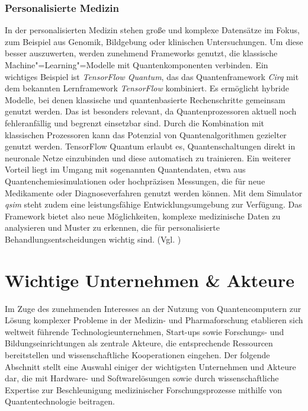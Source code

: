 \subsubsection*{Personalisierte Medizin}
In der personalisierten Medizin stehen große und komplexe Datensätze im Fokus, zum Beispiel aus Genomik, Bildgebung oder klinischen Untersuchungen. Um diese besser auszuwerten, werden zunehmend Frameworks genutzt, die klassische Machine"=Learning"=Modelle mit Quantenkomponenten verbinden. Ein wichtiges Beispiel ist \textit{TensorFlow Quantum}, das das Quantenframework \textit{Cirq} mit dem bekannten Lernframework \textit{TensorFlow} kombiniert. Es ermöglicht hybride Modelle, bei denen klassische und quantenbasierte Rechenschritte gemeinsam genutzt werden. Das ist besonders relevant, da Quantenprozessoren aktuell noch fehleranfällig und begrenzt einsetzbar sind. Durch die Kombination mit klassischen Prozessoren kann das Potenzial von Quantenalgorithmen gezielter genutzt werden. TensorFlow Quantum erlaubt es, Quantenschaltungen direkt in neuronale Netze einzubinden und diese automatisch zu trainieren. Ein weiterer Vorteil liegt im Umgang mit sogenannten Quantendaten, etwa aus Quantenchemiesimulationen oder hochpräzisen Messungen, die für neue Medikamente oder Diagnoseverfahren genutzt werden können. Mit dem Simulator \textit{qsim} steht zudem eine leistungsfähige Entwicklungsumgebung zur Verfügung. Das Framework bietet also neue Möglichkeiten, komplexe medizinische Daten zu analysieren und Muster zu erkennen, die für personalisierte Behandlungsentscheidungen wichtig sind. (Vgl. \cite{broughton_tensorflow_2021})

\section{Wichtige Unternehmen \& Akteure}
Im Zuge des zunehmenden Interesses an der Nutzung von Quantencomputern zur Lösung komplexer Probleme in der Medizin- und Pharmaforschung etablieren sich weltweit führende Technologieunternehmen, Start-ups sowie Forschungs- und Bildungseinrichtungen als zentrale Akteure, die entsprechende Ressourcen bereitstellen und wissenschaftliche Kooperationen eingehen. 
Der folgende Abschnitt stellt eine Auswahl einiger der wichtigsten Unternehmen und Akteure dar, die mit Hardware- und Softwarelösungen sowie durch wissenschaftliche Expertise zur Beschleunigung medizinischer Forschungsprozesse mithilfe von Quantentechnologie beitragen.\\

